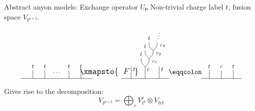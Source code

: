 \documentclass{beamer}
\begin{document}
\begin{frame}{Abstract anyon models: Exchange operator $Uₚ$}
  \pause
  \vspace{1em}
  Non-trivial charge label $t$, fusion space $V_{t^{p+2}}$.
  \vspace{-1em}
  \begin{equation*}
    \begin{tikzpicture}[scale=0.2,font=\footnotesize,anchor=mid]
      \draw (-27, -1) to (-27, -3); %
      \node at (-27, 0) {$t$};
      \draw (-24, -1) to (-24, -3); %
      \node at (-24, 0) {$t$};
      \node at (-21, -1.5) {$\cdots$};
      \draw (-18, -1) to (-18, -3); %
      \node at (-18, 0) {$t$};
      \draw (-15, -1) to (-15, -3); %
      \node at (-15, 0) {$t$};
      \draw (-30, -3) to (-12, -3); %
      \node[font=\large] at (-8, -1.5) {$\xmapsto{\;\;F\;\;}$};
      \draw (2, 6) to [bend left=-30] (3, 4);
      \draw (4, 6) to [bend left=30]  (3, 4);
      \draw (1, 4) to [bend left=-30] (2, 2);
      \draw (3, 4) to [bend left=30]  (2, 2);
      \draw (0, 2) to [bend left=-30] (1, 0);
      \draw (2, 2) to [bend left=30]  (1, 0);
      \draw (1, 0) to (1, -3); %
      \node at (1+0.75, -0.75) {$c$};
      \node[font=\scriptsize] at (3.4, 1.4) {$c_1$};
      \node[font=\scriptsize] at (4.4, 3.4) {$c_2$};
      \node[font=\scriptsize] at (5.4, 5.4) {$c_3$};
      \node at (0, 2+1) {$t$};
      \node at (1, 4+1) {$t$};
      \node at (2, 6+1) {$t$};
      \node[rotate=-20] at (4.25, 6+1.25) {$\vdots$};
      \draw (-5, -3) to (7, -3); %
      \draw (-2.5, 0) to (-2.5, -3); %
      \draw (4.5, 0) to (4.5, -3); %
      \node at (-2.5+0.75, -0.75) {$t$};
      \node at (4.5+0.75, -0.75) {$t$};
      \node[font=\normalsize] at (11, -1.5) {$\eqqcolon$};
      \draw (17, -1) to (17, -3); %
      \draw (20, -1) to (20, -3); %
      \draw (23, -1) to (23, -3); %
      \node at (17, 0) {$t$};
      \node at (20, 0) {$c$};
      \node at (23, 0) {$t$};
      \draw (15, -3) to (25, -3); %
    \end{tikzpicture}
  \end{equation*}
  \pause
  Gives rise to the decomposition:
  \begin{equation*}
    V_{t^{p+2}} = ⨁_c V_{t^p}^c ⊗ V_{tct}
  \end{equation*}
  \vspace{-0.75cm}
  \pause
  \begin{theorem}

\end{theorem}
\end{frame}
\end{document}
